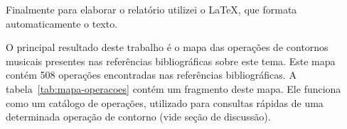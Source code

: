 \documentclass[11pt]{article}
\begin{document}
Finalmente para elaborar o relatório utilizei o \LaTeX, que formata
automaticamente o texto.

\label{sec:resultados}


O principal resultado deste trabalho é o mapa das operações de
contornos musicais presentes nas referências bibliográficas sobre este
tema. Este mapa contém 508 operações encontradas nas referências
bibliográficas. A tabela~\ref{tab:mapa-operacoes} contém um fragmento
deste mapa. Ele funciona como um catálogo de operações, utilizado para
consultas rápidas de uma determinada operação de contorno (vide seção
de discussão).
\end{document}
